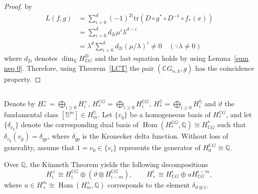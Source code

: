 \documentclass{amsart}
\newcommand{\thmref}[1]{Theorem~\ref{#1}}
\newcommand{\lemref}[1]{Lemma~\ref{#1}}
\begin{document}
\begin{proof}
by
		\[
		\begin{array}{ll}
			L(f,g) &= \sum_{i=0}^d (-1)^{2i}
			\mathrm{tr}(D\circ g^*\circ D^{-1}\circ f_*(x)) \\[6pt]
			&=  \sum_{i=0}^d d_{2i}\mu^i\lambda^{d-i}  \\[6pt]
			&= \lambda^d \sum_{i=0}^d d_{2i}(\mu/\lambda)^i \neq 0 \quad (\because \lambda\neq 0) 
		\end{array}
		\]
		where %
$d_{2i}$ %
denotes $\dim_{\mathbb Q}H^{2i}_{\mathbb CG}$ and %
the last equation holds by using \lemref{sum neq 0}. Therefore, using \thmref{LCT} the pair $(\mathbb{C}G_{n,k},g)$ has the coincidence property.
	\end{proof}
	
	\subsection{} Denote by $H_*^\times = \bigoplus_{i\geq 0} H_i^{\times},\, H_*^{\mathbb{C}G} = \bigoplus_{i\geq 0} H_i^{\mathbb{C}G},\, H_*^{\mathbb{S}} = \bigoplus_{i\geq 0} H_i^{\mathbb{S}}$ and $\vartheta$ the fundamental class $[\mathbb S^m]\in H_m^{\mathbb S}$. Let $\{v_q\}$ be a homogeneous basis of $H_*^{\mathbb{C}G}$, and let $\{\delta_{v_q}\}$ denote the corresponding dual basis of  
$\operatorname{Hom}(H_*^{\mathbb{C}G}, \mathbb Q) \cong H^*_{\mathbb{C}G}$ such %
that  
	$ \delta_{v_q} (v_p) = \delta_{qp}$, where %
$\delta_{qp}$ is the Kronecker delta function. Without loss of generality, assume that $1=v_0 \in \{v_i\}$ represents the generator of $H_0^{\mathbb{C}G} \cong \mathbb Q$.
	
	Over $\mathbb Q$, the K\"unneth Theorem yields the following decompositions 
	\begin{equation}\label{kunneth}
		H_i^\times \cong H_i^{\mathbb{C}G} \oplus (\vartheta \otimes H_{i-m}^{\mathbb{C}G}), 
		\qquad 
		H^i_\times \cong H^i_{\mathbb{C}G} \oplus uH^{i-m}_{\mathbb{C}G},
	\end{equation}
	where  $u \in H^m_{\times} \cong \operatorname{Hom}(H_m^{\times}, \mathbb Q)$ corresponds to the element $\delta_{\vartheta\otimes 1}$.
	
\end{document}
